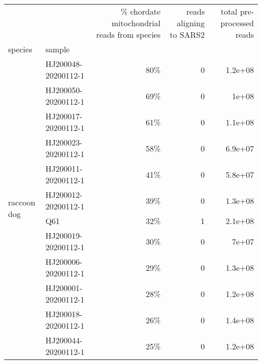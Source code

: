 \begin{tabular}{llrrr}
\toprule
                 &                     & \% chordate mitochondrial reads from species &  reads aligning to SARS2 & total pre-processed reads \\
species & sample &                                             &                          &                           \\
\midrule
\multirow{14}{*}{raccoon dog} & HJ200048-20200112-1 &                                         80\% &                        0 &                   1.2e+08 \\
                 & HJ200050-20200112-1 &                                         69\% &                        0 &                     1e+08 \\
                 & HJ200017-20200112-1 &                                         61\% &                        0 &                   1.1e+08 \\
                 & HJ200023-20200112-1 &                                         58\% &                        0 &                   6.9e+07 \\
                 & HJ200011-20200112-1 &                                         41\% &                        0 &                   5.8e+07 \\
                 & HJ200012-20200112-1 &                                         39\% &                        0 &                   1.3e+08 \\
                 & Q61 &                                         32\% &                        1 &                   2.1e+08 \\
                 & HJ200019-20200112-1 &                                         30\% &                        0 &                     7e+07 \\
                 & HJ200006-20200112-1 &                                         29\% &                        0 &                   1.3e+08 \\
                 & HJ200001-20200112-1 &                                         28\% &                        0 &                   1.2e+08 \\
                 & HJ200018-20200112-1 &                                         26\% &                        0 &                   1.4e+08 \\
                 & HJ200044-20200112-1 &                                         25\% &                        0 &                   1.2e+08 \\

\end{tabular}
